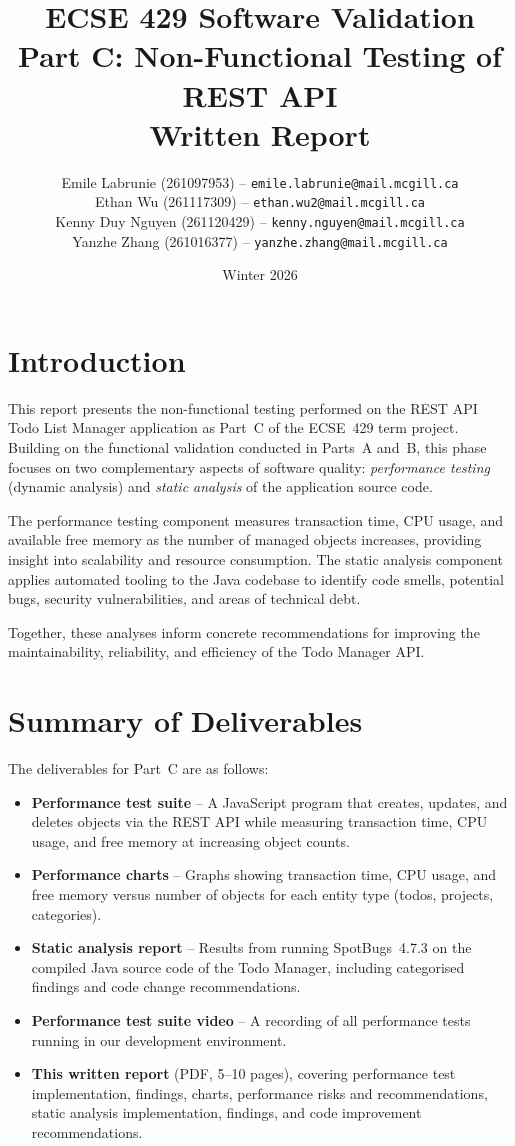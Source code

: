 \documentclass[11pt,a4paper]{article}
\title{%
    \textbf{ECSE 429 Software Validation} \\[0.5em]
    Part C: Non-Functional Testing of REST API \\[0.3em]
    Written Report
}
\author{
    Emile Labrunie (261097953) -- \texttt{emile.labrunie@mail.mcgill.ca} \\
    Ethan Wu (261117309) -- \texttt{ethan.wu2@mail.mcgill.ca} \\
    Kenny Duy Nguyen (261120429) -- \texttt{kenny.nguyen@mail.mcgill.ca} \\
    Yanzhe Zhang (261016377) -- \texttt{yanzhe.zhang@mail.mcgill.ca}
}
\date{Winter 2026}
\begin{document}
\maketitle
\tableofcontents
\newpage

\section{Introduction}

This report presents the non-functional testing performed on the REST API Todo List Manager application as Part~C of the ECSE~429 term project. Building on the functional validation conducted in Parts~A and~B, this phase focuses on two complementary aspects of software quality: \emph{performance testing} (dynamic analysis) and \emph{static analysis} of the application source code.

The performance testing component measures transaction time, CPU usage, and available free memory as the number of managed objects increases, providing insight into scalability and resource consumption. The static analysis component applies automated tooling to the Java codebase to identify code smells, potential bugs, security vulnerabilities, and areas of technical debt.

Together, these analyses inform concrete recommendations for improving the maintainability, reliability, and efficiency of the Todo Manager API.

\section{Summary of Deliverables}

The deliverables for Part~C are as follows:
\begin{itemize}
    \item \textbf{Performance test suite} -- A JavaScript program that creates, updates, and deletes objects via the REST API while measuring transaction time, CPU usage, and free memory at increasing object counts.
    \item \textbf{Performance charts} -- Graphs showing transaction time, CPU usage, and free memory versus number of objects for each entity type (todos, projects, categories).
    \item \textbf{Static analysis report} -- Results from running SpotBugs~4.7.3 on the compiled Java source code of the Todo Manager, including categorised findings and code change recommendations.
    \item \textbf{Performance test suite video} -- A recording of all performance tests running in our development environment.
    \item \textbf{This written report} (PDF, 5--10 pages), covering performance test implementation, findings, charts, performance risks and recommendations, static analysis implementation, findings, and code improvement recommendations.
\end{itemize}
\end{document}
